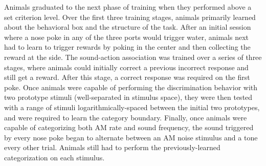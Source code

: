 \begin{landscape}
\begin{table}
{%
Animals graduated to the next phase of training when they performed above a set criterion level.
%
Over the first three training stages, animals primarily learned about the behavioral box and the structure of the task.
%
After an initial session where a nose poke in any of the three ports would trigger water, animals next had to learn to trigger rewards by poking in the center and then collecting the reward at the side.
%
The sound-action association was trained over a series of three stages, where animals could initially correct a previous incorrect response and still get a reward.
%
After this stage, a correct response was required on the first poke.
%
Once animals were capable of performing the discrimination behavior with two prototype stimuli (well-separated in stimulus space), they were then tested with a range of stimuli logarithmically-spaced between the initial two prototypes, and were required to learn the category boundary.
%
Finally, once animals were capable of categorizing both AM rate and sound frequency, the sound triggered by every nose poke began to alternate between an AM noise stimulus and a tone every other trial.
%
Animals still had to perform the previously-learned categorization on each stimulus.}
\end{table}

\end{landscape}



% 

